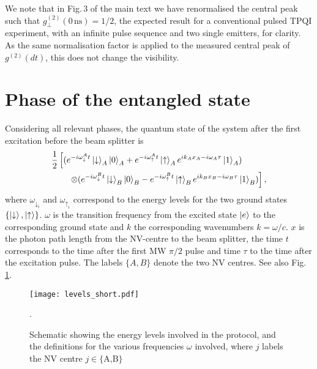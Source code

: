 We note that in Fig.\,3 of the main text we have renormalised the central peak such that $g^{(2)}_\perp(0\,\text{ns}) = 1/2$, the expected result for a conventional pulsed TPQI experiment, with an infinite pulse sequence and two single emitters, for clarity. As the same normalisation factor is applied to the measured central peak of $g^{(2)}(dt)$, this does not change the visibility.%


\section{Phase of the entangled state}
\label{sec:phases}
Considering all relevant phases, the quantum state of the system after the first excitation before the beam splitter is
\begin{align}
&\frac{1}{2} \left[ (e^{-i \omega_{\downarrow}^A t}\left|\downarrow\right>_A\left|0\right>_A + e^{-i \omega_{\uparrow}^A t}\left|\uparrow\right>_A e^{i k_A x_A -i \omega_A \tau}\left|1\right>_A)\right.\\ \nonumber
&\left . \qquad \otimes (e^{-i \omega_{\downarrow}^B t}\left|\downarrow\right>_B \left|0\right>_B - e^{-i \omega_{\uparrow}^B t}\left|\uparrow\right>_B e^{i k_B x_B -i \omega_B \tau}\left|1\right>_B)\right],
\end{align}
where $\omega_{\downarrow_i}$ and $\omega_{\uparrow_i}$ correspond to the energy levels for the two ground states $\{\left|\downarrow\right>,\left|\uparrow\right>\}$. $\omega$ is  the transition frequency from the excited state $\left|e\right>$ to the corresponding ground state and $k$ the corresponding wavenumbers $k=\omega/c$. $x$ is the photon path length from the NV-centre to the beam splitter, the time $t$ corresponds to the time after the first MW $\pi/2$ pulse and time $\tau$ to the time after the excitation pulse. The labels $\{A,B\}$ denote the two NV centres. See also Fig.\,\ref{fig:levels}.

\begin{figure}[h]
\centering
\texttt{[image: levels\_short.pdf]}
\caption{Schematic showing the energy levels involved in the protocol, and the definitions for the various frequencies $\omega$ involved, where $j$ labels the NV centre $j\in \{\text{A,B}\}$}.
\label{fig:levels}
\end{figure}

